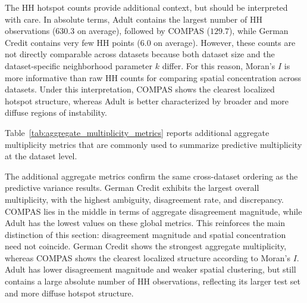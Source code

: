 The HH hotspot counts provide additional context, but should be interpreted with care. In absolute
terms, Adult contains the largest number of HH observations ($630.3$ on average), followed by COMPAS
($129.7$), while German Credit contains very few HH points ($6.0$ on average). However, these counts
are not directly comparable across datasets because both dataset size and the dataset-specific 
neighborhood parameter $k$ differ. For this reason, Moran's $I$ is more informative than raw HH counts
for comparing
spatial concentration across datasets. Under this interpretation, COMPAS shows the clearest localized
hotspot structure, whereas Adult is better characterized by broader and more diffuse regions of instability.

\begin{table}[htbp]
\centering
\caption{Summary of multiplicity and spatial metrics by dataset (mean $\pm$ standard deviation over
10 runs, $K=25$, dataset-specific default $k$: 30 for COMPAS and German Credit, 60 for Adult).}
\label{tab:dataset_summary}

\end{table}

Table~\ref{tab:aggregate_multiplicity_metrics} reports additional aggregate multiplicity metrics
that are commonly used to summarize predictive multiplicity at the dataset level.

\begin{table}[htbp]
\centering
\caption{Additional aggregate multiplicity metrics by dataset (mean $\pm$ standard deviation over
10 runs, global top-$K=25$). Ambiguity measures the mean prediction range across Rashomon models,
disagreement rate is the fraction of test observations for which predictions differ by more than
$\delta = 0.05$, and discrepancy is the maximum pairwise mean absolute prediction difference between models.}
\label{tab:aggregate_multiplicity_metrics}

\end{table}

The additional aggregate metrics confirm the same cross-dataset ordering as the predictive variance
results. German Credit exhibits the largest overall multiplicity, with the highest ambiguity,
disagreement rate, and discrepancy. COMPAS lies in the middle in terms of aggregate disagreement 
magnitude, while Adult has the lowest values on these global metrics. This reinforces the main 
distinction of this section: disagreement magnitude and spatial concentration need not coincide. 
German Credit shows the strongest aggregate multiplicity, whereas COMPAS shows the clearest 
localized structure according to Moran's $I$. Adult has lower disagreement magnitude and weaker
spatial clustering, but still contains a large absolute number of HH observations, reflecting
its larger test set and more diffuse hotspot structure.

